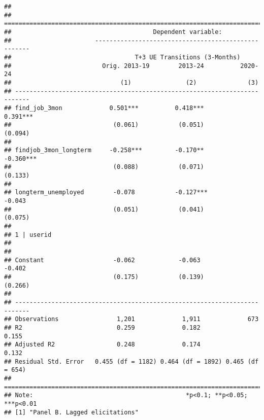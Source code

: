 \begin{verbatim}
## 
## ==========================================================================
##                                       Dependent variable:                 
##                       ----------------------------------------------------
##                                  T+3 UE Transitions (3-Months)            
##                         Orig. 2013-19        2013-24          2020-24     
##                              (1)               (2)              (3)       
## --------------------------------------------------------------------------
## find_job_3mon             0.501***          0.418***          0.391***    
##                            (0.061)           (0.051)          (0.094)     
##                                                                           
## findjob_3mon_longterm     -0.258***         -0.170**         -0.360***    
##                            (0.088)           (0.071)          (0.133)     
##                                                                           
## longterm_unemployed        -0.078           -0.127***          -0.043     
##                            (0.051)           (0.041)          (0.075)     
##                                                                           
## 1 | userid                                                                
##                                                                           
##                                                                           
## Constant                   -0.062            -0.063            -0.402     
##                            (0.175)           (0.139)          (0.266)     
##                                                                           
## --------------------------------------------------------------------------
## Observations                1,201             1,911             673       
## R2                          0.259             0.182            0.155      
## Adjusted R2                 0.248             0.174            0.132      
## Residual Std. Error   0.455 (df = 1182) 0.464 (df = 1892) 0.465 (df = 654)
## ==========================================================================
## Note:                                          *p<0.1; **p<0.05; ***p<0.01
## [1] "Panel B. Lagged elicitations"
\end{verbatim}

